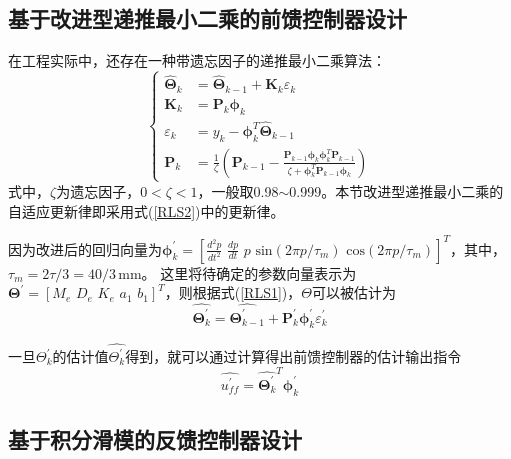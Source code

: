 \subsection{基于改进型递推最小二乘的前馈控制器设计}
在工程实际中，还存在一种带遗忘因子的递推最小二乘算法\cite{butler2012adaptive}：
\begin{equation}
\label{RLS2}
\left\{
\begin{aligned}
\hat{\symbf{\Theta}}_{k}&=\hat{\symbf{\Theta}}_{k-1}+\symbf{K}_{k} \varepsilon_{k}\\
\symbf{K}_{k}&=\symbf{P}_{k} \symbf{\phi}_{k}\\
\varepsilon_{k}&={y_{k}}-{\symbf{\phi}_{k}^{T}\hat{\symbf{\Theta}}_{k-1}}\\
\symbf{P}_{k}&=\frac{1}{\zeta}\left(\symbf{P}_{k-1}-\frac{\symbf{P}_{k-1} \symbf{\phi}_{k} \symbf{\phi}_{k}^{T} \symbf{P}_{k-1}}{\zeta+\symbf{\phi}_{k}^{T} \symbf{P}_{k-1} \symbf{\phi}_{k}}\right)
\end{aligned}
\right.
\end{equation}
式中，$\zeta$为遗忘因子，$0<\zeta<1$，一般取0.98$\sim$0.999。本节改进型递推最小二乘的自适应更新律即采用式(\ref{RLS2})中的更新律。


因为改进后的回归向量为$\symbf{\phi}_{k}^{'}=\left[\frac{d^{2} p}{d t^{2}} \,\,\frac{d p}{d t} \,\,p \,\,\text{sin}\left(2\pi p/\tau_m\right)\,\,\text{cos}\left(2\pi p/\tau_m\right)\right]^{T}$，其中，$\tau_m=2\tau/3=40/3\,\text{mm}$。
这里将待确定的参数向量表示为$\symbf{\Theta}^{'}=[M_e\,\, D_e\,\, K_e\,\,a_1\,\,b_1]^{T}$，则根据式(\ref{RLS1})，$\Theta$可以被估计为
\begin{equation}
\label{3.25}
\hat{\symbf{\Theta}_{k}^{'}}=\hat{\symbf{\Theta}_{k-1}^{'}}+\symbf{P}_{k}^{'} \symbf{\phi}_{k}^{'}\varepsilon_{k}^{'}
\end{equation}
%
%
%
%

一旦$\Theta_k^{'}$的估计值$\hat{\Theta_k^{'}}$得到，就可以通过计算得出前馈控制器的估计输出指令
\begin{equation}
\label{3.26}
\hat{u_{ff}^{'}}=\hat{\symbf{\Theta}_k^{'}}^{T}\symbf{\phi}_{k}^{'}
\end{equation}


\subsection{基于积分滑模的反馈控制器设计}

